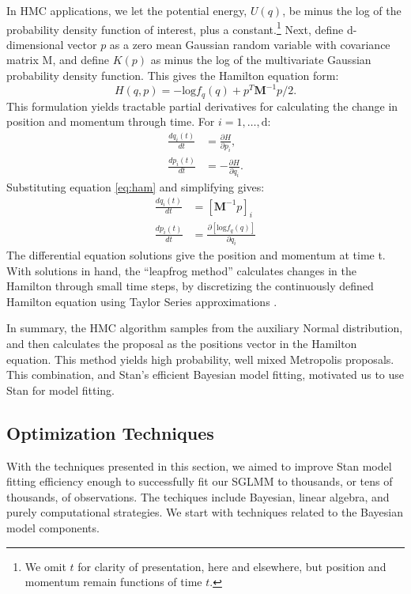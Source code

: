 In HMC applications, we let the potential energy, $U(q)$, be minus the log of the probability density function of interest, plus a constant.\footnote{We omit $t$ for clarity of presentation, here and elsewhere, but position and momentum remain functions of time $t$.} Next, define d-dimensional vector $p$ as a zero mean Gaussian random variable with covariance matrix M, and define $K(p)$ as minus the log of the multivariate Gaussian probability density function. This gives the Hamilton equation form:
\begin{equation} \label{eq:ham}
H(q,p) = -\text{log}f_{q}(q) + p^{T}\pmb{M}^{-1}p/2.
\end{equation}
This formulation yields tractable partial derivatives for calculating the change in position and momentum through time. For $i = 1,\dots, \text{d}$:
\begin{align}
\frac{d q_{i}(t)}{dt} &= \frac{\partial H}{\partial p_{i}}, \\
\frac{d p_{i}(t)}{dt} &= -\frac{\partial H}{\partial q_{i}}.
\end{align}
Substituting equation \ref{eq:ham} and simplifying gives:
\begin{align}
\frac{d q_{i}(t)}{dt} &=  [\pmb{M}^{-1}p]_{i} \\
\frac{d p_{i}(t)}{dt} &= \frac {\partial \left[ \text{log}f_{q}(q) \right]}{\partial q_{i}}
\end{align}
The differential equation solutions give the position and momentum at time t. With solutions in hand, the ``leapfrog method'' calculates changes in the Hamilton through small time steps, by discretizing the continuously defined Hamilton equation using Taylor Series approximations \citep{Neal2011}. 

In summary, the HMC algorithm samples from the auxiliary Normal distribution, and then calculates the proposal as the positions vector in the Hamilton equation. This method yields high probability, well mixed Metropolis proposals. This combination, and Stan's efficient Bayesian model fitting, motivated us to use Stan for model fitting.

\subsection{Optimization Techniques} %
With the techniques presented in this section, we aimed to improve Stan model fitting efficiency enough to successfully fit our SGLMM to thousands, or tens of thousands, of observations. The techiques include Bayesian, linear algebra, and purely computational strategies. We start with techniques related to the Bayesian model components.

